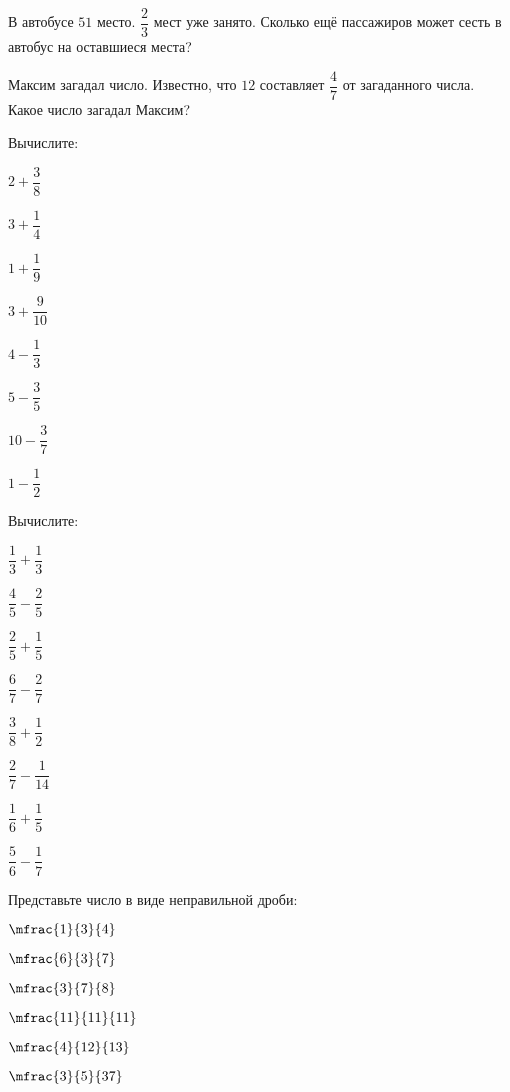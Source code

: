 \begin{listofex}
	\item В автобусе \( 51 \) место. \( \dfrac{2}{3} \) мест уже занято. Сколько ещё пассажиров может сесть в автобус на оставшиеся места?
	\item Максим загадал число. Известно, что \( 12 \) составляет \( \dfrac{4}{7} \) от загаданного числа. Какое число загадал Максим?
	\item Вычислите:
	\begin{enumcols}[itemcolumns=8]
		\item \( 2+\dfrac{3}{8} \)
		\item \( 3+\dfrac{1}{4} \)
		\item \( 1+\dfrac{1}{9} \)
		\item \( 3+\dfrac{9}{10} \)
		\item \( 4-\dfrac{1}{3} \)
		\item \( 5-\dfrac{3}{5} \)
		\item \( 10-\dfrac{3}{7} \)
		\item \( 1-\dfrac{1}{2} \)
	\end{enumcols}
	\item Вычислите:
		\begin{enumcols}[itemcolumns=8]
		\item \( \dfrac{1}{3}+\dfrac{1}{3} \)
		\item \( \dfrac{4}{5}-\dfrac{2}{5} \)
		\item \( \dfrac{2}{5}+\dfrac{1}{5} \)
		\item \( \dfrac{6}{7}-\dfrac{2}{7} \)
		\item \( \dfrac{3}{8}+\dfrac{1}{2} \)
		\item \( \dfrac{2}{7}-\dfrac{1}{14} \)
		\item \( \dfrac{1}{6}+\dfrac{1}{5} \)
		\item \( \dfrac{5}{6}-\dfrac{1}{7} \)
	\end{enumcols}
	\item Представьте число в виде неправильной дроби:
		\begin{enumcols}[itemcolumns=6]
			\item \( \mfrac{1}{3}{4} \)
			\item \( \mfrac{6}{3}{7} \)
			\item \( \mfrac{3}{7}{8} \)
			\item \( \mfrac{11}{11}{11} \)
			\item \( \mfrac{4}{12}{13} \)
			\item \( \mfrac{3}{5}{37} \)
	\end{enumcols}

\end{listofex}
